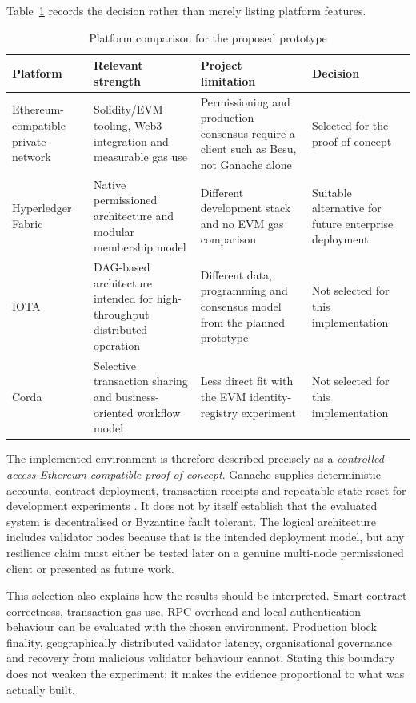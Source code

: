 Table~\ref{tab:platform-comparison} records the decision rather than merely listing platform features.

\begin{table}[htbp]
    \centering
    \caption{Platform comparison for the proposed prototype}
    \label{tab:platform-comparison}
    \begin{tabular}{|p{}|p{}|p{}|p{}|}
        \hline
        \textbf{Platform} & \textbf{Relevant strength} & \textbf{Project limitation} & \textbf{Decision} \\
        \hline
        Ethereum-compatible private network & Solidity/EVM tooling, Web3 integration and measurable gas use & Permissioning and production consensus require a client such as Besu, not Ganache alone & Selected for the proof of concept \\
        \hline
        Hyperledger Fabric & Native permissioned architecture and modular membership model & Different development stack and no EVM gas comparison & Suitable alternative for future enterprise deployment \\
        \hline
        IOTA & DAG-based architecture intended for high-throughput distributed operation & Different data, programming and consensus model from the planned prototype & Not selected for this implementation \\
        \hline
        Corda & Selective transaction sharing and business-oriented workflow model & Less direct fit with the EVM identity-registry experiment & Not selected for this implementation \\
        \hline
    \end{tabular}
\end{table}

The implemented environment is therefore described precisely as a \emph{controlled-access Ethereum-compatible proof of concept}. Ganache supplies deterministic accounts, contract deployment, transaction receipts and repeatable state reset for development experiments \cite{GanacheDocumentation}. It does not by itself establish that the evaluated system is decentralised or Byzantine fault tolerant. The logical architecture includes validator nodes because that is the intended deployment model, but any resilience claim must either be tested later on a genuine multi-node permissioned client or presented as future work.

This selection also explains how the results should be interpreted. Smart-contract correctness, transaction gas use, RPC overhead and local authentication behaviour can be evaluated with the chosen environment. Production block finality, geographically distributed validator latency, organisational governance and recovery from malicious validator behaviour cannot. Stating this boundary does not weaken the experiment; it makes the evidence proportional to what was actually built.

